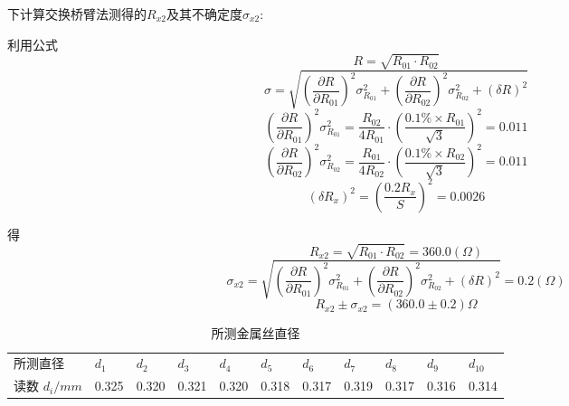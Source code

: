 \documentclass{ctexart}
\begin{document}
 
 下计算交换桥臂法测得的$R_{x2}$及其不确定度$\sigma_{x2}$:
 
 利用公式$$R=\sqrt{R_{01}\cdot R_{02}}$$
$$\sigma=\sqrt{(\frac{\partial R}{\partial R_{01}})^2\sigma_{R_{01}}^2+(\frac{\partial R}{\partial R_{02}})^2\sigma_{R_{02}}^2+(\delta R)^2}$$
$$(\frac{\partial R}{\partial R_{01}})^2\sigma_{R_{01}}^2=\frac{R_{02}}{4R_{01}}\cdot (\frac{0.1\% \times R_{01}}{\sqrt{3}})^2=0.011$$
$$(\frac{\partial R}{\partial R_{02}})^2\sigma_{R_{02}}^2=\frac{R_{01}}{4R_{02}}\cdot (\frac{0.1\% \times R_{02}}{\sqrt{3}})^2=0.011$$
$$(\delta R_x)^2=(\frac{0.2R_x}{S})^2=0.0026$$

得
$$R_{x2}=\sqrt{R_{01}\cdot R_{02}}=360.0(\Omega)$$
$$\sigma_{x2}=\sqrt{(\frac{\partial R}{\partial R_{01}})^2\sigma_{R_{01}}^2+(\frac{\partial R}{\partial R_{02}})^2\sigma_{R_{02}}^2+(\delta R)^2}=0.2(\Omega)$$
$$R_{x2}\pm\sigma_{x2}=(360.0\pm0.2)\Omega$$
\begin{table}[H]
  \centering
  \caption{所测金属丝直径}
   
      \resizebox{\textwidth}{!}
      {
        \begin{tabular}{lrrrrrrrrrr}
    所测直径 & \multicolumn{1}{l}{$d_1$} & \multicolumn{1}{l}{$d_2$} & \multicolumn{1}{l}{$d_3$} & \multicolumn{1}{l}{$d_4$} & \multicolumn{1}{l}{$d_5$} & \multicolumn{1}{l}{$d_6$} & \multicolumn{1}{l}{$d_7$} & \multicolumn{1}{l}{$d_8$} & \multicolumn{1}{l}{$d_9$} & \multicolumn{1}{l}{$d_{10}$} \\
    读数  $d_i/mm$  & 0.325 & 0.320  & 0.321 & 0.320  & 0.318 & 0.317 & 0.319 & 0.317 & 0.316 & 0.314 \\
    \end{tabular}%
      }
  \label{tab:addlabel}%
\end{table}%
\end{document}
